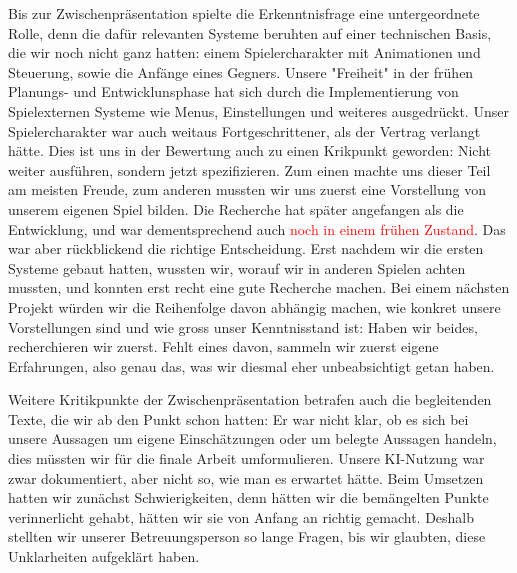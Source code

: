 \documentclass[../Main.tex]{subfiles}
\begin{document}
Bis zur Zwischenpräsentation spielte die Erkenntnisfrage eine untergeordnete Rolle, denn die dafür relevanten Systeme beruhten auf einer technischen Basis, die wir noch nicht ganz hatten: einem Spielercharakter mit Animationen und Steuerung, sowie die Anfänge eines Gegners. Unsere "Freiheit" in der frühen Planungs- und Entwicklunsphase hat sich durch die Implementierung von Spielexternen Systeme wie Menus, Einstellungen und weiteres ausgedrückt. Unser Spielercharakter war auch weitaus Fortgeschrittener, als der Vertrag verlangt hätte. Dies ist uns in der Bewertung auch zu einen Krikpunkt geworden: Nicht weiter ausführen, sondern jetzt spezifizieren. Zum einen machte uns dieser Teil am meisten Freude, zum anderen mussten wir uns zuerst eine Vorstellung von unserem eigenen Spiel bilden. Die Recherche hat später angefangen als die Entwicklung, und war dementsprechend auch \textcolor{red}{noch in einem frühen Zustand}. Das war aber rückblickend die richtige Entscheidung. Erst nachdem wir die ersten Systeme gebaut hatten, wussten wir, worauf wir in anderen Spielen achten mussten, und konnten erst recht eine gute Recherche machen. Bei einem nächsten Projekt würden wir die Reihenfolge davon abhängig machen, wie konkret unsere Vorstellungen sind und wie gross unser Kenntnisstand ist: Haben wir beides, recherchieren wir zuerst. Fehlt eines davon, sammeln wir zuerst eigene Erfahrungen, also genau das, was wir diesmal eher unbeabsichtigt getan haben.

Weitere Kritikpunkte der Zwischenpräsentation betrafen auch die begleitenden Texte, die wir ab den Punkt schon hatten: Er war nicht klar, ob es sich bei unsere Aussagen um eigene Einschätzungen oder um belegte Aussagen handeln, dies müssten wir für die finale Arbeit umformulieren. Unsere KI-Nutzung war zwar dokumentiert, aber nicht so, wie man es erwartet hätte. Beim Umsetzen hatten wir zunächst Schwierigkeiten, denn hätten wir die bemängelten Punkte verinnerlicht gehabt, hätten wir sie von Anfang an richtig gemacht. Deshalb stellten wir unserer Betreuungsperson so lange Fragen, bis wir glaubten, diese Unklarheiten aufgeklärt haben.
\end{document}
